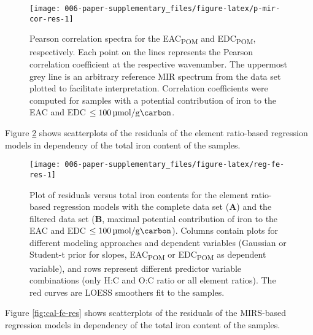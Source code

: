 \documentclass[draft,linenumbers]{agujournal2018}
\begin{document}
\begin{figure}[H]

{\centering \texttt{[image: 006-paper-supplementary\_files/figure-latex/p-mir-cor-res-1]} 

}

\caption{Pearson correlation spectra for the EAC\textsubscript{POM} and EDC\textsubscript{POM}, respectively. Each point on the lines represents the Pearson correlation coefficient at the respective wavenumber. The uppermost grey line is an arbitrary reference MIR spectrum from the data set plotted to facilitate interpretation. Correlation coefficients were computed for samples with a potential contribution of iron to the EAC and EDC $\le\SI{100}{\micro\mol\per\gram\carbon}$.}\label{fig:p-mir-cor-res}
\end{figure}

\clearpage

Figure \ref{fig:reg-fe-res} shows scatterplots of the residuals of the
element ratio-based regression models in dependency of the total iron
content of the samples.

\begin{figure}[H]

{\centering \texttt{[image: 006-paper-supplementary\_files/figure-latex/reg-fe-res-1]} 

}

\caption{Plot of residuals versus total iron contents for the element ratio-based regression models with the complete data set (\textbf{A}) and the filtered data set (\textbf{B}, maximal potential contribution of iron to the EAC and EDC $\le\SI{100}{\micro\mol\per\gram\carbon}$). Columns contain plots for different modeling approaches and dependent variables (Gaussian or Student-t prior for slopes, EAC\textsubscript{POM} or EDC\textsubscript{POM} as dependent variable), and rows represent different predictor variable combinations (only H:C and O:C ratio or all element ratios). The red curves are LOESS smoothers fit to the samples.}\label{fig:reg-fe-res}
\end{figure}

\clearpage

Figure \ref{fig:cal-fe-res} shows scatterplots of the residuals of the
MIRS-based regression models in dependency of the total iron content of
the samples.
\end{document}
